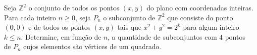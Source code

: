 Seja $\mathbb Z^2$ o conjunto de todos os pontos $(x,y)$ do plano com coordenadas inteiras.
Para cada inteiro $n\geq 0$, seja $P_n$ o subconjunto de $\mathbb Z^2$ que consiste do ponto $(0,0)$ e de todos os pontos $(x,y)$ tais que $x^2+y^2=2^k$ para algum inteiro $k\leq n$. Determine, em função de $n$, a quantidade de subconjuntos com $4$ pontos de $P_n$ cujos elementos são vértices de um quadrado.

